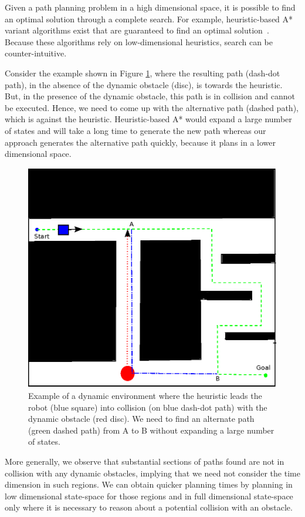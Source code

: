Given a path planning problem in a high dimensional space, it is possible to find an optimal solution through a complete search. For example, heuristic-based A* variant algorithms exist that are guaranteed to find an optimal solution~\cite{silver2005cooperative}. Because these algorithms rely on low-dimensional heuristics, search can be counter-intuitive.  

Consider the example shown in Figure \ref{fig:ppad-motivation}, where the resulting path (dash-dot path), in the absence of the dynamic obstacle (disc), is towards the heuristic. But, in the presence of the dynamic obstacle, this path is in collision and cannot be executed. Hence, we need to come up with the alternative path (dashed path), which is against the heuristic. Heuristic-based A* would expand a large number of states and will take a long time to generate the new path whereas our approach generates the alternative path quickly, because it plans in a lower dimensional space.

\begin{figure}[tb!]
\centering%
\includegraphics[width=0.7\linewidth]{Figures/intro.eps}%
\caption{Example of a dynamic environment where the heuristic leads the robot (blue square) into collision (on blue dash-dot path) with the dynamic obstacle (red disc). We need to find an alternate path (green dashed path) from A to B without expanding a large number of states.}%
\label{fig:ppad-motivation}
\end{figure}

More generally, we observe that substantial sections of paths found are not in collision with any dynamic obstacles, implying that we need not consider the time dimension in such regions. We can obtain quicker planning times by planning in low dimensional state-space for those regions and in full dimensional state-space only where it is necessary to reason about a potential collision with an obstacle. 

